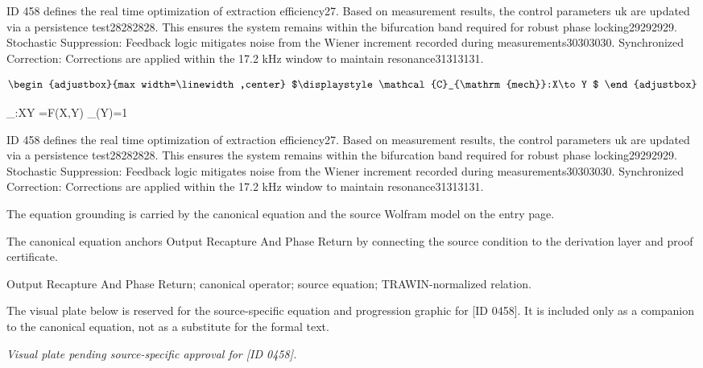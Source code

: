 ID 458 defines the real time optimization of extraction efficiency27. Based on measurement results, the control parameters uk are updated via a persistence test28282828. This ensures the system remains within the bifurcation band required for robust phase locking29292929. Stochastic Suppression: Feedback logic mitigates noise from the Wiener increment recorded during measurements30303030. Synchronized Correction: Corrections are applied within the 17.2 kHz window to maintain resonance31313131.

\[
\begin{adjustbox}{max width=\linewidth,center}
$\displaystyle
\mathcal{C}_{\mathrm{mech}}:X\to Y
$
\end{adjustbox}
\]

\tzpequationlinks
  {_{}:X\to Y}
  {=F(X,Y)}
  {_{}(Y)=1}

ID 458 defines the real time optimization of extraction efficiency27. Based on measurement results, the control parameters uk are updated via a persistence test28282828. This ensures the system remains within the bifurcation band required for robust phase locking29292929. Stochastic Suppression: Feedback logic mitigates noise from the Wiener increment recorded during measurements30303030. Synchronized Correction: Corrections are applied within the 17.2 kHz window to maintain resonance31313131.

The equation grounding is carried by the canonical equation and the source Wolfram model on the entry page.

The canonical equation anchors Output Recapture And Phase Return by connecting the source condition to the derivation layer and proof certificate.

Output Recapture And Phase Return; canonical operator; source equation; TRAWIN-normalized relation.
\endgroup

\begingroup\footnotesize\sloppy
The visual plate below is reserved for the source-specific equation and progression graphic for [ID 0458]. It is included only as a companion to the canonical equation, not as a substitute for the formal text.
\par\endgroup
\begingroup\footnotesize\itshape
Visual plate pending source-specific approval for [ID 0458].
\par\endgroup

